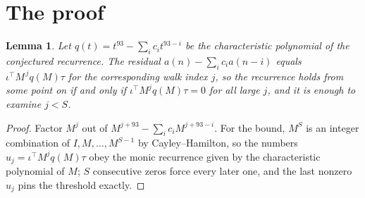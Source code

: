 \documentclass[11pt,a4paper]{article}
\theoremstyle{plain}
\newtheorem{lemma}[theorem]{Lemma}
\theoremstyle{definition}
\begin{document}
\section{The proof}

\begin{lemma}\label{lem:crit}
Let $q(t)=t^{93}-\sum_i c_it^{93-i}$ be the characteristic polynomial of the
conjectured recurrence. The residual $a(n)-\sum_ic_ia(n-i)$ equals
$\iota^{\!\top}M^{\,j}q(M)\tau$ for the corresponding walk index $j$, so the recurrence
holds from some point on if and only if $\iota^{\!\top}M^{j}q(M)\tau=0$ for all large $j$,
and it is enough to examine $j<S$.
\end{lemma}

\begin{proof}
Factor $M^{j}$ out of $M^{j+93}-\sum_ic_iM^{j+93-i}$. For the bound, $M^{S}$
is an integer combination of $I,M,\dots,M^{S-1}$ by Cayley--Hamilton, so the numbers
$u_j=\iota^{\!\top}M^{j}q(M)\tau$ obey the monic recurrence given by the characteristic
polynomial of $M$; $S$ consecutive zeros force every later one, and the last nonzero $u_j$
pins the threshold exactly.
\end{proof}
\end{document}
